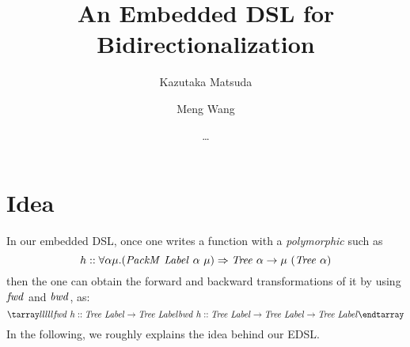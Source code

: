 \documentclass{article}
\title{An Embedded DSL for Bidirectionalization}
\author{Kazutaka Matsuda \and Meng Wang \and \dots}
\theoremstyle{definition}
\begin{document}
\maketitle








\section{Idea}
In our embedded DSL, once one writes a function with a \emph{polymorphic} such as 
\[
 h :: \forall \alpha \mu. (\mathit{PackM}~\mathit{Label}~\alpha~\mu)
  \Rightarrow \mathit{Tree}~\alpha \to \mu~(\mathit{Tree}~\alpha)
\]
then the one can obtain the forward and backward transformations of it by using 
$\mathit{fwd}$ and $\mathit{bwd}$, as:
\[
\bb
  \mi{fwd}~h :: \mi{Tree}~\mi{Label} \to \mi{Tree}~\mi{Label}\\
  \mi{bwd}~h :: \mi{Tree}~\mi{Label} \to \mi{Tree}~\mi{Label} \to \mi{Tree}~\mi{Label}
\ee
\]
In the following, we roughly explains the idea behind our EDSL. 
\end{document}
